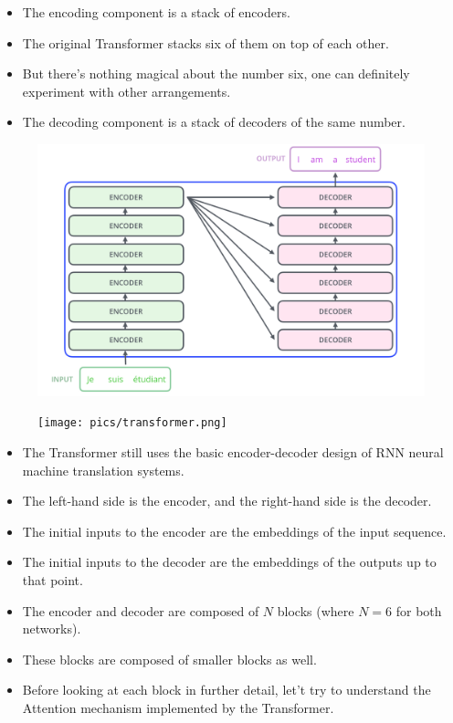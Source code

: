  \begin{itemize}
  \item  The encoding component is a stack of encoders.
  \item The original Transformer stacks six of them on top of each other.
  \item But there’s nothing magical about the number six, one can definitely experiment with other arrangements. 
  \item The decoding component is a stack of decoders of the same number.
 \end{itemize}


     \begin{figure}[h]
        	\includegraphics[scale = 0.2]{pics/The_transformer_encoder_decoder_stack.png}
        \end{figure}  

     \begin{figure}[h]
        	\texttt{[image: pics/transformer.png]}
        \end{figure}  


\begin{itemize}

 \item  The Transformer still uses the basic encoder-decoder design of RNN neural machine translation systems.
 
 \item The left-hand side is the encoder, and the right-hand side is the decoder. 
 
 \item The initial inputs to the encoder are the embeddings of the input sequence.
 \item The initial inputs to the decoder are the embeddings of the outputs up to that point. 
 
 \item The encoder and decoder are composed of $N$ blocks (where $N = 6$ for both networks).
 
 \item These blocks are composed of smaller blocks as well. 
 
 \item Before looking at each block in further detail, let't try to understand the Attention mechanism implemented by the Transformer.
 
\end{itemize}



